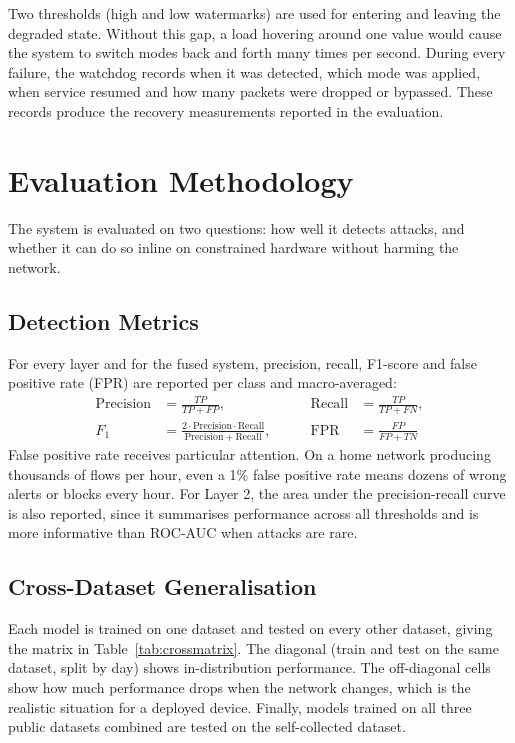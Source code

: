 \noindent Two thresholds (high and low watermarks) are used for entering and leaving the degraded state. Without this gap, a load hovering around one value would cause the system to switch modes back and forth many times per second. During every failure, the watchdog records when it was detected, which mode was applied, when service resumed and how many packets were dropped or bypassed. These records produce the recovery measurements reported in the evaluation.

\section{Evaluation Methodology}\label{sec:5.10}
\label{sec:evaluation}
\noindent The system is evaluated on two questions: how well it detects attacks, and whether it can do so inline on constrained hardware without harming the network.

\subsection{Detection Metrics}\label{sec:5.10.1}
\label{sec:metrics}
\noindent For every layer and for the fused system, precision, recall, F1-score and false positive rate (FPR) are reported per class and macro-averaged:
\begin{equation}
\label{eq:metrics}
\begin{aligned}
\mathrm{Precision} &= \frac{TP}{TP + FP}, \qquad &
\mathrm{Recall} &= \frac{TP}{TP + FN}, \\
F_1 &= \frac{2 \cdot \mathrm{Precision} \cdot \mathrm{Recall}}{\mathrm{Precision} + \mathrm{Recall}}, \qquad &
\mathrm{FPR} &= \frac{FP}{FP + TN}
\end{aligned}
\end{equation}
\noindent False positive rate receives particular attention. On a home network producing thousands of flows per hour, even a 1\% false positive rate means dozens of wrong alerts or blocks every hour. For Layer 2, the area under the precision-recall curve is also reported, since it summarises performance across all thresholds and is more informative than ROC-AUC when attacks are rare.

\subsection{Cross-Dataset Generalisation}\label{sec:5.10.2}
\label{sec:crossdataset}
\noindent Each model is trained on one dataset and tested on every other dataset, giving the matrix in Table~\ref{tab:crossmatrix}. The diagonal (train and test on the same dataset, split by day) shows in-distribution performance. The off-diagonal cells show how much performance drops when the network changes, which is the realistic situation for a deployed device. Finally, models trained on all three public datasets combined are tested on the self-collected dataset.

